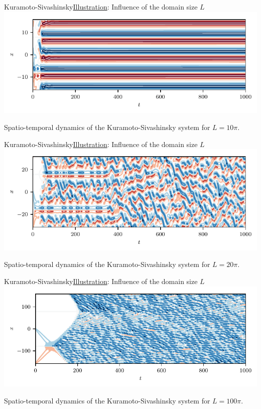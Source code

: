 \documentclass[usenames,dvipsnames,svgnames,10pt,aspectratio=169]{beamer}
\begin{document}
\begin{frame}[t, c]{Kuramoto-Sivashinsky}{\underline{Illustration}: Influence of the domain size $L$}
	\centering
	\includegraphics[width=.75\textwidth]{kuramoto_sivashinsky_medium_domain}

	Spatio-temporal dynamics of the Kuramoto-Sivashinsky system for $L = 10 \pi$.

	\vspace{1cm}
\end{frame}

\begin{frame}[t, c]{Kuramoto-Sivashinsky}{\underline{Illustration}: Influence of the domain size $L$}
	\centering
	\includegraphics[width=.75\textwidth]{kuramoto_sivashinsky_medium_large_domain}

	Spatio-temporal dynamics of the Kuramoto-Sivashinsky system for $L = 20 \pi$.

	\vspace{1cm}
\end{frame}

\begin{frame}[t, c]{Kuramoto-Sivashinsky}{\underline{Illustration}: Influence of the domain size $L$}
	\centering
	\includegraphics[width=.75\textwidth]{kuramoto_sivashinsky_large_domain}

	Spatio-temporal dynamics of the Kuramoto-Sivashinsky system for $L = 100 \pi$.

	\vspace{1cm}
\end{frame}
\end{document}
